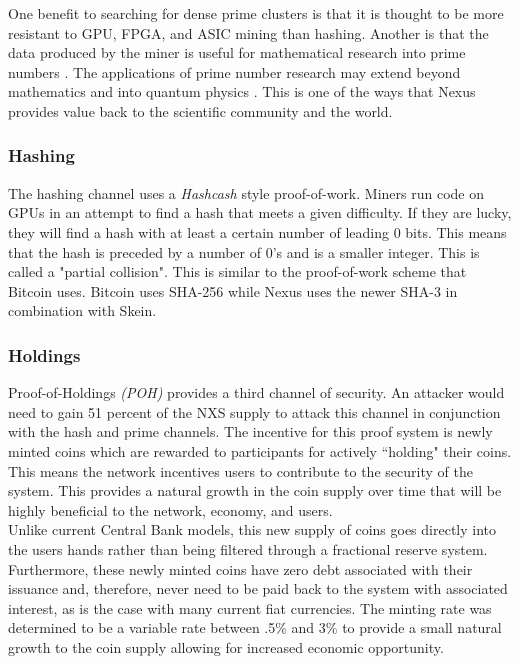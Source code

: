 \documentclass[11pt]{article}
\begin{document}
\noindent One benefit to searching for dense prime clusters is that it is thought to be more resistant to GPU, FPGA, and ASIC mining than hashing.
Another is that the data produced by the miner is useful for mathematical research into prime numbers \cite{findingprimeclusterspaper} \cite{nxsprimecom}.
The applications of prime number research may extend beyond mathematics and into quantum physics \cite{physicsmathprime}.
This is one of the ways that Nexus provides value back to the scientific community and the world.

\subsubsection{Hashing}

The hashing channel uses a \textit{Hashcash} \cite{hashcash} style proof-of-work.
Miners run code \cite{skminer,wolfniro} on GPUs in an attempt to find a hash that meets a given difficulty.
If they are lucky, they will find a hash with at least a certain number of leading 0 bits. 
This means that the hash is preceded by a number of 0's and is a smaller integer. 
This is called a "partial collision".
This is similar to the proof-of-work scheme that Bitcoin uses.
Bitcoin uses SHA-256 while Nexus uses the newer SHA-3 in combination with Skein.

\subsubsection{Holdings}

Proof-of-Holdings \textit{(POH)} provides a third channel of security.
An attacker would need to gain 51 percent of the NXS supply to attack this channel in conjunction with the hash and prime channels.
The incentive for this proof system is newly minted coins which are rewarded to participants for actively ``holding" their coins. 
This means the network incentives users to contribute to the security of the system. 
This provides a natural growth in the coin supply over time that will be highly beneficial to the network, economy, and users.\\ 

\noindent Unlike current Central Bank models, this new supply of coins goes directly into the users hands rather than being filtered through a fractional reserve system. 
Furthermore, these newly minted coins have zero debt associated with their issuance and, therefore, never need to be paid back to the system with associated interest, as is the case with many current fiat currencies.
The minting rate was determined to be a variable rate between .5\% and 3\% to provide a small natural growth to the coin supply allowing for increased economic opportunity.
\end{document}
